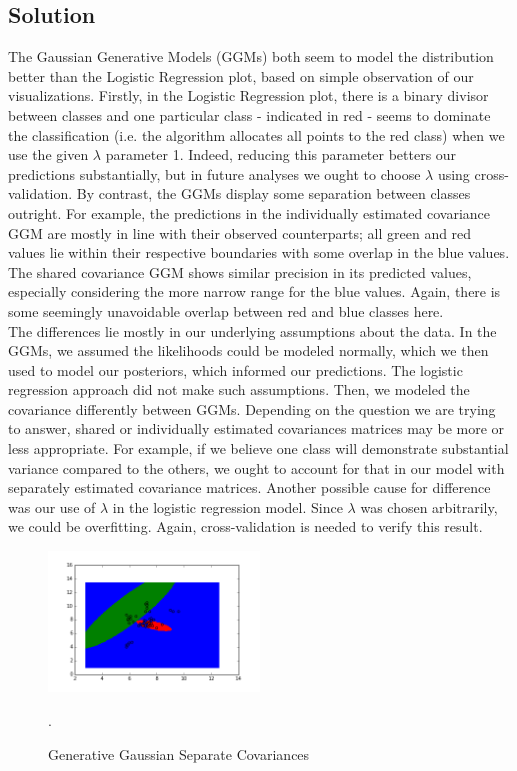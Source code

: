 \documentclass[submit]{harvardml}
\begin{document}
\subsection*{Solution}

The Gaussian Generative Models (GGMs) both seem to model the distribution better than the Logistic Regression plot, based on simple observation of our visualizations. Firstly, in the Logistic Regression plot, there is a binary divisor between classes and one particular class - indicated in red - seems to dominate the classification (i.e. the algorithm allocates all points to the red class) when we use the given $\lambda$ parameter 1. Indeed, reducing this parameter betters our predictions substantially, but in future analyses we ought to choose $\lambda$ using cross-validation. By contrast, the GGMs display some separation between classes outright. For example, the predictions in the individually estimated covariance GGM are mostly in line with their observed counterparts; all green and red values lie within their respective boundaries with some overlap in the blue values. The shared covariance GGM shows similar precision in its predicted values, especially considering the more narrow range for the blue values. Again, there is some seemingly unavoidable overlap between red and blue classes here. \\

The differences lie mostly in our underlying assumptions about the data. In the GGMs, we assumed the likelihoods could be modeled normally, which we then used to model our posteriors, which informed our predictions. The logistic regression approach did not make such assumptions. Then, we modeled the covariance differently between GGMs. Depending on the question we are trying to answer, shared or individually estimated covariances matrices may be more or less appropriate. For example, if we believe one class will demonstrate substantial variance compared to the others, we ought to account for that in our model with separately estimated covariance matrices. Another possible cause for difference was our use of $\lambda$ in the logistic regression model. Since $\lambda$ was chosen arbitrarily, we could be overfitting. Again, cross-validation is needed to verify this result.  

\begin{figure}[h]
	\centering
	\includegraphics[width=0.5\textwidth]{generative_result_separate_covariances}
	\caption{Generative Gaussian Separate Covariances}.
	\label{fig:separate}
\end{figure}
\end{document}
